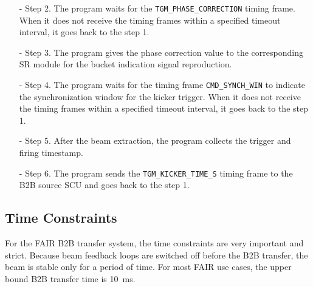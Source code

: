 \begin{itemize}
\begin{itemize}
		\item[-]Step 2. The program waits for the \verb|TGM_PHASE_CORRECTION| timing frame. When it does not receive the timing frames within a specified timeout interval, it goes back to the step 1.
		\item[-]Step 3. The program gives the phase correction value to the corresponding SR module for the bucket indication signal reproduction.
 		\item[-]Step 4. The program waits for the timing frame \verb|CMD_SYNCH_WIN| to indicate the synchronization window for the kicker trigger. When it does not receive the timing frames within a specified timeout interval, it goes back to the step 1.
		\item[-]Step 5. After the beam extraction, the program collects the trigger and firing timestamp. 
		\item[-]Step 6. The program sends the \verb|TGM_KICKER_TIME_S| timing frame to the B2B source SCU and goes back to the step 1.
	\end{itemize}

\end{itemize}
\subsection{Time Constraints}
For the FAIR B2B transfer system, the time constraints are very important and strict. Because beam feedback loops are switched off before the B2B transfer, the beam is stable only for a period of time. For most FAIR use cases, the upper bound B2B transfer time is \SI{10}{\ms}. 

